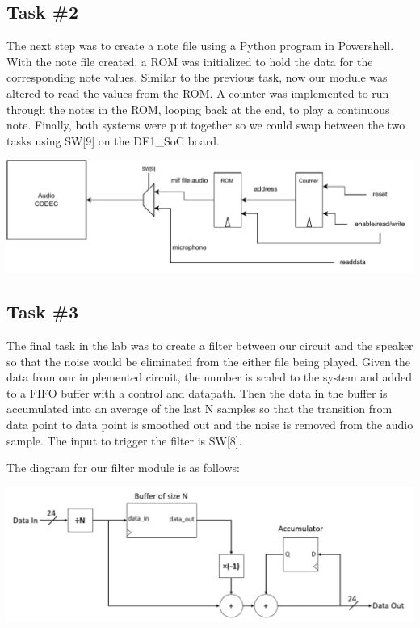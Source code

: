 \documentclass[11pt, titlepage]{article}
\begin{document}
        \subsection{Task \#2}
            The next step was to create a note file using a Python program in Powershell. With the note file created, a ROM was initialized to hold the data for the corresponding note values. Similar to the previous task, now our module was altered to read the values from the ROM. A counter was implemented to run through the notes in the ROM, looping back at the end, to play a continuous note. Finally, both systems were put together so we could swap between the two tasks using SW[9] on the DE1\_SoC board.
            \begin{center}
                \includegraphics[scale = 0.7]{Images/task 2 block diagram.pdf}
            \end{center}
        
        \subsection{Task \#3}
        The final task in the lab was to create a filter between our circuit and the speaker so that the noise would be eliminated from the either file being played. Given the data from our implemented circuit, the number is scaled to the system and added to a FIFO buffer with a control and datapath. Then the data in the buffer is accumulated into an average of the last N samples so that the transition from data point to data point is smoothed out and the noise is removed from the audio sample. The input to trigger the filter is SW[8].

        The diagram for our filter module is as follows:

        \begin{center}
            \includegraphics[scale=0.8]{Images/filter diagram.png}
        \end{center}
\end{document}
